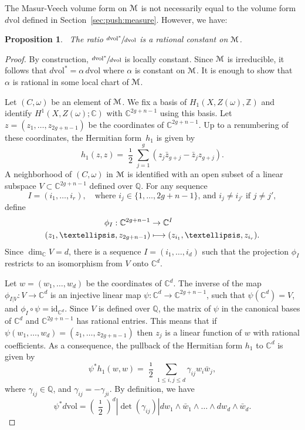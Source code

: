 \documentclass[11pt]{article}
\numberwithin{equation}{section}
\let\mathcal\EuScript
\newcommand\mto{\mathchoice{\longmapsto}{\mapsto}{\mapsto}{\mapsto}}
\theoremstyle{plain}
\newtheorem{Proposition}[Theorem]{Proposition}
\theoremstyle{definition}
\def\C{\mathbb{C}}
\newcommand\Z{\mathbb{Z}}
\newcommand{\Q}{\mathbb{Q}}
\newcommand{\cM}{\mathcal{M}}
\newcommand{\id}{\mathrm{id}}
\newcommand{\vol}{\mathrm{vol}}
\begin{document}
The Masur-Veech volume form on $\cM$ is not necessarily equal to the volume form $d\vol$ defined in Section~\ref{sec:push:measure}. However, we have:

\begin{Proposition}~\label{prop:compare:meas:arith}
The ratio $\sfrac{d\vol^*}{d\vol}$ is a rational constant on $\cM$.
\end{Proposition}

\begin{proof}
By construction, $\sfrac{d\vol^*}{d\vol}$ is locally constant. Since $\cM$ is irreducible, it follows that $d\vol^*=\alpha\, d\vol$ where $\alpha$ is constant on $\cM$. It is enough to show that $\alpha$ is rational in some local chart of $\cM$.

Let $(C,\omega)$ be an element of $\cM$. We fix a basis of $H_1(X,Z(\omega),\Z)$ and identify $H^1(X,Z(\omega);\C)$ with $\C^{2g+n-1}$ using this basis.
Let $z=(z_1,\dots, z_{2g+n-1})$ be the coordinates of $\C^{2g+n-1}$.
Up to a renumbering of these coordinates, the Hermitian form~$h_1$ is given by
\[
h_1(z,z)=\frac{\imath}{2}\sum_{j=1}^g(z_j\bar{z}_{g+j}-\bar{z}_jz_{g+j}).
\]
A neighborhood of $(C,\omega)$ in $\cM$ is identified with an open subset of a linear subspace $V\subset \C^{2g+n-1}$ defined over $\Q$.
For any sequence
\[
I=(i_1,\dots,i_r),\quad\text{where $i_j\in \{1,\dots,2g+n-1\}$, and $i_j\neq i_{j'}$ if $j\neq j'$},
\]
define
\begin{align*}
\phi_I: \C^{2g+n-1} & \to \C^{I}\\
(z_1,\dots,z_{2g+n-1}) & \mto (z_{i_1},\dots,z_{i_r}).
\end{align*}
Since $\dim_\C V=d$, there is a sequence $I=(i_1,\dots,i_d)$ such that the projection $\phi_I$ restricts to an isomorphism from $V$ onto $\C^{d}$.

Let $w=(w_1,\dots,w_d)$ be the coordinates of $\C^d$. The inverse of the map \hbox{$\phi_{I|V}: V \to \C^d$} is an injective linear map $\psi: \C^d \to \C^{2g+n-1}$, such that $\psi(\C^d)=V$, and $\phi_I\circ\psi =\id_{\C^d}$. Since $V$ is defined over $\Q$, the matrix of $\psi$ in the canonical bases of $\C^d$ and $\C^{2g+n-1}$ has rational entries. This means that if $\psi(w_1,\dots,w_d)=(z_1,\dots,z_{2g+n-1})$ then $z_j$ is a linear function of $w$ with rational coefficients.
As a consequence, the pullback of the Hermitian form $h_1$ to $\C^{d}$ is given by
\[
\psi^*h_1(w,w)=\frac{\imath}{2}\sum_{1\leq i,j\leq d}\gamma_{ij}w_i\bar{w}_j,
\]
where $\gamma_{ij}\in \Q$, and $\gamma_{ij}=-\gamma_{ji}$.
By definition, we have
\[
\psi^*d\vol=\left(\frac{\imath}{2}\right)^d\left|{\det}(\gamma_{ij})\right|dw_1\wedge\bar{w}_1\wedge\dots\wedge dw_d\wedge\bar{w}_d.
\]


\end{proof}
\end{document}

